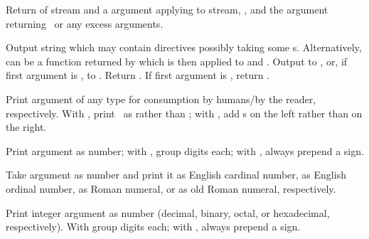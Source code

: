 \begin{LIST}{1cm}

  {
  Return  of stream and a  argument applying  to
  stream, , and the  argument
  returning \NIL\ or any excess arguments. 
  }

  {
  Output string  which may
  contain \kwd{\TLD} directives possibly taking some
  s. Alternatively,  can be a function returned
  by  which is then applied to  and .
  Output to ,  or, if first
  argument is \T, to . Return \retval{\NIL}. If
  first argument is \NIL, return . 
  }

  \begin{LIST}{.5cm}

    {
    Print argument of any type for consumption by humans/by the
    reader, respectively. With \kwd{:}, print \NIL\ as \LIT{()} rather
    than ; with , add s on the left
    rather than on the right.
  }

    {
    Print argument as number; with \KWD{:}, group digits 
     each; with , always prepend a sign.
  }

    {
    Take argument as number and print it as English cardinal number,
    as English ordinal number, as Roman numeral, or as old Roman
    numeral, respectively.
  }

    {
    Print integer argument as number (decimal, binary, octal, or
    hexadecimal, respectively). With \kwd{:} group digits 
     each; with , always prepend a sign.
  }


\end{LIST}
\end{LIST}
